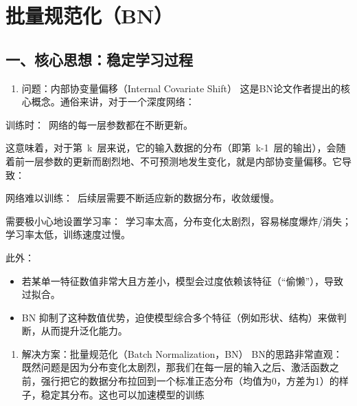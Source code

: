 \setcounter{section}{2}

\hypertarget{ux6279ux91cfux89c4ux8303ux5316bn}{%
\section{批量规范化（BN）}\label{ux6279ux91cfux89c4ux8303ux5316bn}}

\hypertarget{ux4e00ux6838ux5fc3ux601dux60f3ux7a33ux5b9aux5b66ux4e60ux8fc7ux7a0b}{%
\subsection{一、核心思想：稳定学习过程}\label{ux4e00ux6838ux5fc3ux601dux60f3ux7a33ux5b9aux5b66ux4e60ux8fc7ux7a0b}}

\begin{enumerate}
\def\labelenumi{\arabic{enumi}.}
\tightlist
\item
  问题：内部协变量偏移（Internal Covariate Shift）
  这是BN论文作者提出的核心概念。通俗来讲，对于一个深度网络：
\end{enumerate}

训练时：~网络的每一层参数都在不断更新。

这意味着，对于第~k~层来说，它的输入数据的分布（即第~k-1~层的输出），会随着前一层参数的更新而剧烈地、不可预测地发生变化，就是内部协变量偏移。它导致：

网络难以训练：~后续层需要不断适应新的数据分布，收敛缓慢。

需要极小心地设置学习率：~学习率太高，分布变化太剧烈，容易梯度爆炸/消失；学习率太低，训练速度过慢。

此外：

\begin{itemize}
\item
  若某单一特征数值非常大且方差小，模型会过度依赖该特征（``偷懒''），导致过拟合。
\item
  BN 抑制了这种数值优势，迫使模型综合多个特征（例如形状、结构）来做判断，从而提升泛化能力。
\end{itemize}

\begin{enumerate}
\def\labelenumi{\arabic{enumi}.}
\setcounter{enumi}{1}
\tightlist
\item
  解决方案：批量规范化（Batch Normalization，BN）
  BN的思路非常直观：既然问题是因为分布变化太剧烈，那我们在每一层的输入之后、激活函数之前，强行把它的数据分布拉回到一个标准正态分布（均值为0，方差为1）的样子，稳定其分布。这也可以加速模型的训练
\end{enumerate}

